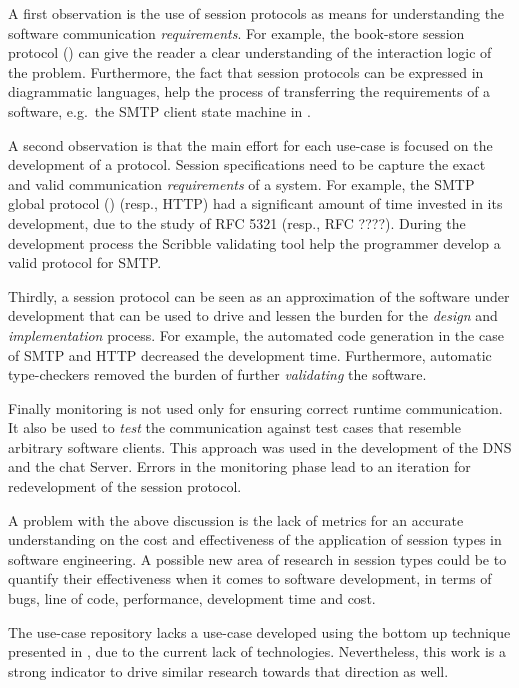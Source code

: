 A first observation is the use of session protocols
as means for understanding the software communication
{\em requirements}. For example, the book-store
session protocol () can give
the reader a clear understanding of the interaction logic of
the problem. Furthermore, the fact that session protocols
can be expressed in diagrammatic languages, help
the process of transferring the requirements of a software,
e.g.~the SMTP client state machine in .

A second observation is that the main effort for each use-case
is focused on the development of a protocol.
Session specifications need to be capture the exact
and valid communication {\em requirements} of a system.
For example, the SMTP global protocol () (resp., HTTP)
had a significant amount of time invested in its development,
due to the study of RFC 5321 (resp., RFC ????).
During the development process the Scribble validating tool
help the programmer develop a valid protocol for SMTP.

Thirdly, a session protocol can be seen as an approximation
of the software under development that can be used to drive
and lessen the burden for the {\em design} and {\em implementation} process.
For example, the automated code generation in the case of
SMTP and HTTP decreased the development time. Furthermore,
automatic type-checkers removed the burden of further
{\em validating} the software.

Finally monitoring is not used only for ensuring
correct runtime communication.
It also be used to {\em test} the communication
against test cases that resemble arbitrary software clients.
This approach was used in the development of the DNS and
the chat Server. Errors in the monitoring phase
lead to an iteration for redevelopment of the session protocol.

A problem with the above discussion is the lack of metrics
for an accurate understanding on the cost and effectiveness
of the application of session types in software engineering.
A possible new area of research in session types could
be to quantify their effectiveness when it comes to software development,
in terms of bugs, line of code, performance, development time and cost.

The use-case repository lacks a use-case developed using the
bottom up technique presented in , due to
the current lack of technologies. Nevertheless, this work
is a strong indicator to drive similar research towards
that direction as well.

